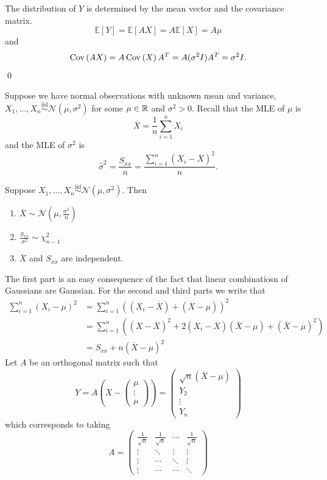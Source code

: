 \documentclass{article}
\newcommand{\iid}{\overset{\text{iid}}{\sim}}
\begin{document}
\pf The distribution of $ Y $ is determined by the mean vector and the covariance matrix. 
\[
	\mathbb E[Y] = \mathbb E[AX] = A\mathbb E[X] = A\mu
\]
and
\[
	\operatorname{Cov}\left({AX}\right) = A\operatorname{Cov}\left({X}\right)A^T=A(\sigma^2 I)A^T = \sigma^2 I.
\]
\qed
\par
Suppose we have normal observations with unknown mean and variance, $ X_1,\dots, X_n \iid \mathcal N(\mu,\sigma^2) $ for some $ \mu\in \mathbb{R} $ and $ \sigma^2>0 $. Recall that the MLE of $ \mu $ is 
\[
	\overline X = \frac 1n \sum_{i=1}^n X_i
\]
and the MLE of $ \sigma^2 $ is 
\[
	\hat\sigma^2 = \frac{S_{xx}}n = \frac{\sum_{i=1}^n (X_i-\overline X)^2}n.
\]
\begin{theorem}
  Suppose $ X_1,\dots, X_n \iid \mathcal N(\mu,\sigma^2)$. Then
  \begin{enumerate}
	  \item  $\overline X \sim \mathcal N\left(\mu, \frac{\sigma^2}n\right) $
	  \item $ \frac{S_{xx}}{\sigma^2} \sim \chi^2_{n-1} $
	  \item $ \overline X $ and $ S_{xx} $ are independent.
  \end{enumerate}
\end{theorem}
\pf The first part is an easy consequence of the fact that linear combinatiosn of Gaussians are Gaussian. For the second and third parts we write that
\begin{align*}
	\sum_{i=1}^n (X_i-\mu)^2 &= \sum_{i=1}^n((X_i-\overline X)+(\overline X-\mu))^2 \\
				 &= \sum_{i=1}^n ((X-\overline X)^2 + 2(X_i - \overline X)(\overline X-\mu) +(\overline X - \mu)^2) \\
				 &= S_{xx} + n(\overline X-\mu)^2
\end{align*}
Let $ A $ be an orthogonal matrix such that
\[
  Y=A\left(X-\begin{pmatrix}
    \mu\\
    \vdots \\
    \mu
  \end{pmatrix}\right) = \begin{pmatrix}
    \sqrt n (\overline X - \mu) \\
    Y_2\\
    \vdots\\
    Y_n
  \end{pmatrix}
\]
which corresponds to taking
\[
  A=\begin{pmatrix}
	  \frac 1{\sqrt n} & \frac 1{\sqrt n} & \cdots & \frac 1{\sqrt n} \\
	   \vdots & \ddots  & \vdots & \vdots \\
	\vdots 	 & \cdots & \ddots & \vdots\\
	\vdots 	 & \cdots & \cdots &\ddots
  \end{pmatrix}
\]
\end{document}
